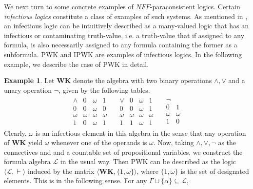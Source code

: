 \documentclass[submission]{eptcs}
\newcommand{\lang}{\mathcal{L}}
\theoremstyle{definition}
\newtheorem{exa}[thm]{Example}
\begin{document}
We next turn to some concrete examples of $NFF$-paraconsistent logics. Certain \emph{infectious logics} constitute a class of examples of such systems. As mentioned in \cite{Omori-Szmuc2017}, an infectious logic can be intuitively described as a many-valued logic that has an infectious or contaminating truth-value, i.e. a truth-value that if assigned to any formula, is also necessarily assigned to any formula containing the former as a subformula. PWK and IPWK are examples of infectious logics. In the following example, we describe the case of PWK in detail.

\begin{exa}
Let $\mathbf{WK}$ denote the algebra with two binary operations $\land,\lor$ and a unary operation $\neg$, given by the following tables.
        \[
        \begin{array}{lll}
             \begin{array}{c|ccc}
                  \land&0&\omega&1\\
                  \hline
                  0&0&\omega&0\\
                  \omega&\omega&\omega&\omega\\
                  1&0&\omega&1
             \end{array}\;&
             \begin{array}{c|ccc}
                 \lor&0&\omega&1\\
                  \hline
                  0&0&\omega&1\\
                  \omega&\omega&\omega&\omega\\
                  1&1&\omega&1
             \end{array}\;&
            \begin{array}{c|c}
                \neg&\\
                 \hline
                 0&1\\
                 \omega&\omega\\
                 1&0
            \end{array}
        \end{array}
        \]
Clearly, $\omega$ is an infectious element in this algebra in the sense that any operation of $\mathbf{WK}$ yield $\omega$ whenever one of the operands is $\omega$. Now, taking $\land,\lor,\neg$ as the connectives and and a countable set of propositional variables, we construct the formula algebra $\lang$ in the usual way. Then PWK can be described as the logic $\langle\lang,\vdash\rangle$ induced by the matrix $\langle\mathbf{WK},\{1,\omega\}\rangle$, where $\{1,\omega\}$ is the set of designated elements. This is in the following sense. For any $\Gamma\cup\{\alpha\}\subseteq\lang$,

\end{exa}
\end{document}
